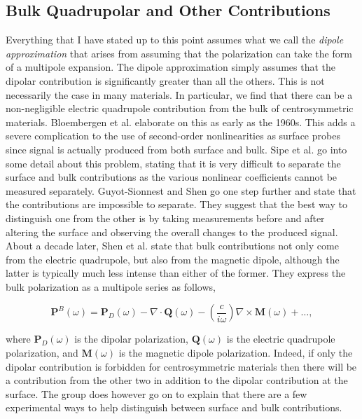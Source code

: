 \documentclass[10pt]{article}
\begin{document}
\subsection{Bulk Quadrupolar and Other Contributions}\label{chap_theory_quad}
Everything that I have stated up to this point assumes what we call the \emph{dipole approximation} that arises from assuming that the polarization can take the form of a multipole expansion. The dipole approximation simply assumes that the dipolar contribution is significantly greater than all the others. This is not necessarily the case in many materials. In particular, we find that there can be a non-negligible electric quadrupole contribution from the bulk of centrosymmetric materials. Bloembergen et al. \cite{PhysRev.174.813} elaborate on this as early as the 1960s. This adds a severe complication to the use of second-order nonlinearities as surface probes since signal is actually produced from both surface and bulk. Sipe et al. \cite{sipe1987fundamental} go into some detail about this problem, stating that it is very difficult to separate the surface and bulk contributions as the various nonlinear coefficients cannot be measured separately. Guyot-Sionnest and Shen \cite{PhysRevB.38.7985} go one step further and state that the contributions are impossible to separate. They suggest that the best way to distinguish one from the other is by taking measurements before and after altering the surface and observing the overall changes to the produced signal. About a decade later, Shen et al. \cite{shen1999surface} state that bulk contributions not only come from the electric quadrupole, but also from the magnetic dipole, although the latter is typically much less intense than either of the former. They express the bulk polarization as a multipole series as follows,

\begin{equation}
\mathbf{P}^{B}(\omega) = \mathbf{P}_{D}(\omega) - \nabla\cdot\mathbf{Q}(\omega) - \left(\frac{c}{i\omega}\right)\nabla\times\mathbf{M}(\omega) + \ldots,
\end{equation}

where $\mathbf{P}_{D}(\omega)$ is the dipolar polarization, $\mathbf{Q}(\omega)$ is the electric quadrupole polarization, and $\mathbf{M}(\omega)$ is the magnetic dipole polarization. Indeed, if only the dipolar contribution is forbidden for centrosymmetric materials then there will be a contribution from the other two in addition to the dipolar contribution at the surface. The group does however go on to explain that there are a few experimental ways to help distinguish between surface and bulk contributions.
\end{document}
